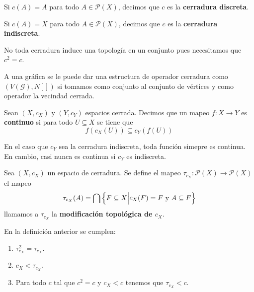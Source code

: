 \documentclass[12pt]{report}
\theoremstyle{largebreak}
\newcommand\cf[3]{\ensuremath{#1:#2\rightarrow#3}}
\begin{document}
    \begin{exa}
        Si $c(A)=A$ para todo $A\in\mathcal{P}(X)$, decimos que $c$ es la \textbf{cerradura discreta}.
    \end{exa}

    \begin{exa}
        Si $c(A)=X$ para todo $A\in\mathcal{P}(X)$, decimos que $c$ es la \textbf{cerradura indiscreta}.
    \end{exa}

    \begin{obs}
        No toda cerradura induce una topología en un conjunto pues necesitamos que $c^2=c$.
    \end{obs}

    A una gráfica se le puede dar una estructura de operador cerradura como $(V(\mathcal{G}),N[])$ si tomamos como conjunto al conjunto de vértices y como operador la vecindad cerrada.
    \begin{mydef}
        Sean $(X,c_X)$ y $(Y,c_Y)$ espacios cerrada. Decimos que un mapeo $\cf{f}{X}{Y}$ es \textbf{continuo} si para todo $U\subseteq X$ se tiene que
        \begin{equation}
            f(c_X(U))\subseteq c_Y(f(U))
        \end{equation}
    \end{mydef}

    \begin{obs}
        En el caso que $c_Y$ sea la cerradura indiscreta, toda función simepre es continua. En cambio, casi nunca es continua si $c_Y$ es indiscreta.
    \end{obs}

    \begin{mydef}
        Sea $(X,c_X)$ un espacio de cerradura. Se define el mapeo $\cf{\tau_{c_X}}{\mathcal{P}(X)}{\mathcal{P}(X)}$ el mapeo
        \begin{equation*}
            \tau_{c_X}(A)=\bigcap\left\{F\subseteq X\Big|c_X(F)=F\textup{ y }A\subseteq F\right\}
        \end{equation*}
        llamamos a $\tau_{c_X}$ la \textbf{modificación topológica de $c_X$}.
    \end{mydef}

    \begin{obs}
        En la definición anterior se cumplen:
        \begin{enumerate}
            \item $\tau_{c_X}^2=\tau_{c_X}$.
            \item $c_X<\tau_{c_X}$.
            \item Para todo $c$ tal que $c^2=c$ y $c_X<c$ tenemos que $\tau_{c_X}<c$.
        \end{enumerate}
    \end{obs}
\end{document}
